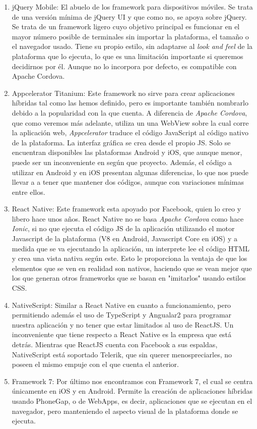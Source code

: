 \begin{enumerate}
  \item jQuery Mobile: El abuelo de los framework para dispositivos móviles. Se trata de una versión mínima de jQuery UI y que como no, se apoya sobre jQuery. Se trata de un framework ligero cuyo objetivo principal es funcionar en el mayor número posible de terminales sin importar la plataforma, el tamaño o el navegador usado. Tiene su propio estilo, sin adaptarse al \emph{look and feel} de la plataforma que lo ejecuta, lo que es una limitación importante si queremos decidirnos por él. Aunque no lo incorpora por defecto, es compatible con Apache Cordova.
  \item Appcelerator Titanium: Este framework no sirve para crear aplicaciones híbridas tal como las hemos definido, pero es importante también nombrarlo debido a la popularidad con la que cuenta. A diferencia de \emph{Apache Cordova}, que como veremos más adelante, utiliza un una WebView sobre la cual corre la aplicación web, \emph{Appcelerator} traduce el código JavaScript al código nativo de la plataforma. La interfaz gráfica se crea desde el propio \gls{JS}. Solo se encuentran disponibles las plataformas Android y iOS, que aunque menor, puede ser un inconveniente en según que proyecto. Además, el código a utilizar en Android y en iOS presentan algunas diferencias, lo que nos puede llevar a a tener que mantener dos códigos, aunque con variaciones mínimas entre ellos.
  \item React Native: Este framework esta apoyado por Facebook, quien lo creo y libero hace unos años. React Native no se basa \emph{Apache Cordova} como hace \emph{Ionic}, si no que ejecuta el código \gls{JS} de la aplicación utilizando el motor Javascript de la plataforma (V8 en Android, Javascript Core en iOS) y a medida que se va ejecutando la aplicación, un interprete lee el código \gls{HTML} y crea una vista nativa según este. Esto le proporciona la ventaja de que los elementos que se ven en realidad son nativos, haciendo que se vean mejor que los que generan otros frameworks que se basan en "imitarlos" usando estilos \gls{CSS}.
  \item NativeScript: Similar a React Native en cuanto a funcionamiento, pero permitiendo además el uso de TypeScript y Angualar2 para programar nuestra aplicación y no tener que estar limitados al uso de ReactJS. Un inconveniente que tiene respecto a React Native es la empresa que está detrás. Mientras que ReactJS cuenta con Facebook a sus espaldas, NativeScript está soportado Telerik, que sin querer menospreciarles, no poseen el mismo empuje con el que cuenta el anterior.
  \item Framework 7: Por último nos encontramos con Framework 7, el cual se centra únicamente en iOS y en Android. Permite la creación de aplicaciones híbridas usando PhoneGap, o de WebApps, es decir, aplicaciones que se ejecutan en el navegador, pero manteniendo el aspecto visual de la plataforma donde se ejecuta.
\end{enumerate}

